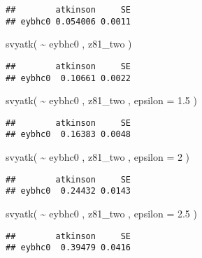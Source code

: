 \documentclass[
]{book}
\newenvironment{Shaded}{\begin{snugshade}}{\end{snugshade}}
\newcommand{\AttributeTok}[1]{\textcolor[rgb]{0.77,0.63,0.00}{#1}}
\newcommand{\DecValTok}[1]{\textcolor[rgb]{0.00,0.00,0.81}{#1}}
\newcommand{\FloatTok}[1]{\textcolor[rgb]{0.00,0.00,0.81}{#1}}
\newcommand{\FunctionTok}[1]{\textcolor[rgb]{0.00,0.00,0.00}{#1}}
\newcommand{\NormalTok}[1]{#1}
\newcommand{\SpecialCharTok}[1]{\textcolor[rgb]{0.00,0.00,0.00}{#1}}
\begin{document}
\begin{verbatim}
##        atkinson     SE
## eybhc0 0.054006 0.0011
\end{verbatim}

\begin{Shaded}
\begin{Highlighting}[]
\FunctionTok{svyatk}\NormalTok{( }\SpecialCharTok{\textasciitilde{}}\NormalTok{ eybhc0 , z81\_two )}
\end{Highlighting}
\end{Shaded}

\begin{verbatim}
##        atkinson     SE
## eybhc0  0.10661 0.0022
\end{verbatim}

\begin{Shaded}
\begin{Highlighting}[]
\FunctionTok{svyatk}\NormalTok{( }\SpecialCharTok{\textasciitilde{}}\NormalTok{ eybhc0 , z81\_two , }\AttributeTok{epsilon =} \FloatTok{1.5}\NormalTok{ )}
\end{Highlighting}
\end{Shaded}

\begin{verbatim}
##        atkinson     SE
## eybhc0  0.16383 0.0048
\end{verbatim}

\begin{Shaded}
\begin{Highlighting}[]
\FunctionTok{svyatk}\NormalTok{( }\SpecialCharTok{\textasciitilde{}}\NormalTok{ eybhc0 , z81\_two , }\AttributeTok{epsilon =} \DecValTok{2}\NormalTok{ )}
\end{Highlighting}
\end{Shaded}

\begin{verbatim}
##        atkinson     SE
## eybhc0  0.24432 0.0143
\end{verbatim}

\begin{Shaded}
\begin{Highlighting}[]
\FunctionTok{svyatk}\NormalTok{( }\SpecialCharTok{\textasciitilde{}}\NormalTok{ eybhc0 , z81\_two , }\AttributeTok{epsilon =} \FloatTok{2.5}\NormalTok{ )}
\end{Highlighting}
\end{Shaded}

\begin{verbatim}
##        atkinson     SE
## eybhc0  0.39479 0.0416
\end{verbatim}
\end{document}
